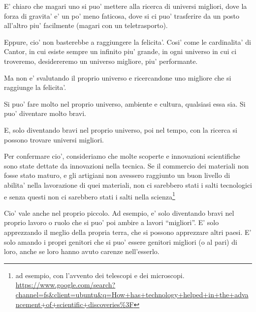 E' chiaro che magari uno si puo' mettere alla ricerca di universi migliori, dove la forza di gravita' e' un po' meno faticosa, dove si ci puo' trasferire da un posto all'altro piu' facilmente (magari con un teletrasporto).

Eppure, cio' non basterebbe a raggiungere la felicita'. Cosi' come le cardinalita' di Cantor, in cui esiste sempre un infinito piu' grande, in ogni universo in cui ci troveremo, desidereremo un universo migliore, piu' performante.

Ma non e' svalutando il proprio universo e ricercandone uno migliore che si raggiunge la felicita'.

Si puo' fare molto nel proprio universo, ambiente e cultura, qualsiasi essa sia. Si puo' diventare molto bravi.

E, solo diventando bravi nel proprio universo, poi nel tempo, con la ricerca si possono trovare universi migliori.

Per confermare cio', consideriamo che molte scoperte e innovazioni scientifiche sono state dettate da innovazioni nella tecnica. Se il commercio dei materiali non fosse stato maturo, e gli artigiani non avessero raggiunto un buon livello di abilita' nella lavorazione di quei materiali, non ci sarebbero stati i salti tecnologici e senza questi non ci sarebbero stati i salti nella scienza\footnote{ad esempio, con l'avvento dei telescopi e dei microscopi. \url{https://www.google.com/search?channel=fs&client=ubuntu\&q=How+has+technology+helped+in+the+advancement+of+scientific+discoveries\%3F}}

Cio' vale anche nel proprio piccolo. Ad esempio, e' solo diventando bravi nel proprio lavoro o ruolo che si puo' poi ambire a lavori ``migliori''. E' solo apprezzando il meglio della propria terra, che si possono apprezzare altri paesi. E' solo amando i propri genitori che si puo' essere genitori migliori (o al pari) di loro, anche se loro hanno avuto carenze nell'esserlo.

